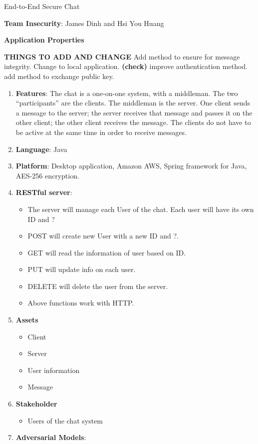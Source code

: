 \documentclass{article}
\begin{document}
End-to-End Secure Chat\newline

\textbf{Team Insecurity}: James Dinh and Hsi You Huang\newline

\textbf{Application Properties}\newline

\textbf{THINGS TO ADD AND CHANGE}
Add method to ensure for message integrity.\newline
Change to local application. \textbf{(check)}\newline
improve authentication method.\newline
add method to exchange public key.\newline


\begin{enumerate}
	\item \textbf{Features}: The chat is a one-on-one system, with a middleman. The two
     “participants” are the clients. The middleman is the server. One client sends a message to the
     server; the server receives that message and passes it on the other client; the other client 
     receives the message. The clients do not have to be active at the same time in order to receive
     messages.
	\item \textbf{Language}: Java
    \item \textbf{Platform}: Desktop application, Amazon AWS, Spring framework for Java, AES-256 encryption.
    \item \textbf{RESTful server}:
    	\begin{itemize}
    		\item The server will manage each User of the chat. Each user will have its own ID and ?
         	\item POST will create new User with a new ID and ?.
            \item GET will read the information of user based on ID.
            \item PUT will update info on each user.
            \item DELETE will delete the user from the server.
            \item Above functions work with HTTP.
        \end{itemize}
	\item \textbf{Assets}
    	\begin{itemize}
        	\item Client
            \item Server
            \item User information
			\item Message
        \end{itemize} 
    \item \textbf{Stakeholder}
    	\begin{itemize}
        	\item Users of the chat system
        \end{itemize}
    \item \textbf{Adversarial Models}:
    	\begin {itemize}
  

\end{itemize}
\end{enumerate}
\end{document}
